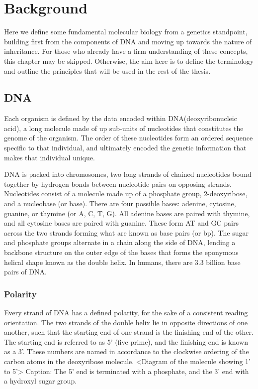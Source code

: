 

\chapter{Background}

Here we define some fundamental molecular biology from a genetics standpoint, building first from the components of DNA and moving up towards the nature of inheritance. For those who already have a firm understanding of these concepts, this chapter may be skipped. Otherwise, the aim here is to define the terminology and outline the principles that will be used in the rest of the thesis.

\section{DNA}

Each organism is defined by the data encoded within DNA(deoxyribonucleic acid), a long molecule made of up sub-units of \gls{nucleotides} that constitutes the \gls{genome} of the organism. The order of these nucleotides form an ordered sequence specific to that individual, and ultimately encoded the genetic information that makes that individual unique.

DNA is packed into \gls{chromosomes}, two long strands of chained nucleotides bound together by hydrogen bonds between nucleotide pairs on opposing strands. Nucleotides consist of a molecule made up of a phosphate group, 2-deoxyribose, and a \gls{nucleobase} (or base). There are four possible bases: adenine, cytosine, guanine, or thymine (or A, C, T, G).  All adenine bases are paired with thymine, and all cytosine bases are paired with guanine. 
These form AT and GC pairs across the two strands forming what are known as \gls{base pairs} (or bp).
The sugar and phosphate groups alternate in a chain along the side of DNA, lending a backbone structure on the outer edge of the bases that forms the eponymous helical shape known as the \gls{double helix}.  In humans, there are 3.3 billion base pairs of DNA.


\subsection{Polarity}

Every strand of DNA has a defined polarity, for the sake of a consistent reading orientation. The two strands of the double helix lie in opposite directions of one another, such that the starting end of one strand is the finishing end of the other.
The starting end is referred to as 5' (five prime), and the finishing end is known as a 3'. These numbers are named in accordance to the clockwise ordering of the carbon atoms in the deoxyribose molecule. 
<Diagram of the molecule showing 1' to 5'>
Caption: The 5' end is terminated with a phosphate, and the 3' end with a hydroxyl sugar group.

